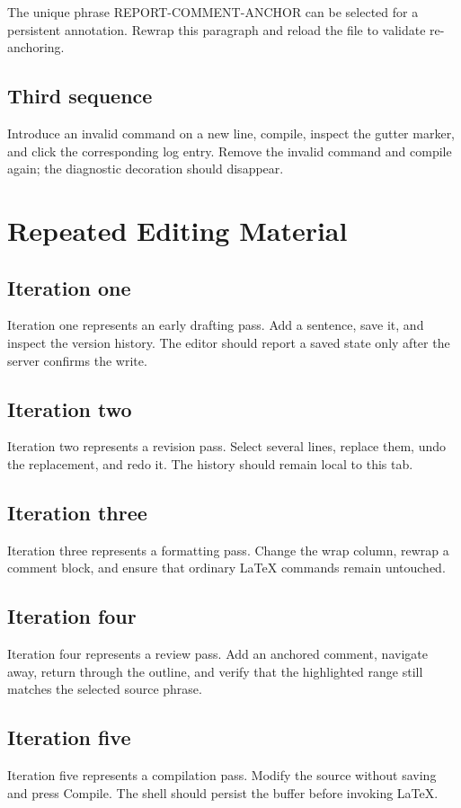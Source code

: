 \documentclass[12pt]{report}
\begin{document}
The unique phrase REPORT-COMMENT-ANCHOR can be selected for a persistent
annotation. Rewrap this paragraph and reload the file to validate re-anchoring.

\section{Third sequence}
Introduce an invalid command on a new line, compile, inspect the gutter marker,
and click the corresponding log entry. Remove the invalid command and compile
again; the diagnostic decoration should disappear.

\chapter{Repeated Editing Material}
\section{Iteration one}
Iteration one represents an early drafting pass. Add a sentence, save it, and
inspect the version history. The editor should report a saved state only after
the server confirms the write.

\section{Iteration two}
Iteration two represents a revision pass. Select several lines, replace them,
undo the replacement, and redo it. The history should remain local to this tab.

\section{Iteration three}
Iteration three represents a formatting pass. Change the wrap column, rewrap a
comment block, and ensure that ordinary LaTeX commands remain untouched.

\section{Iteration four}
Iteration four represents a review pass. Add an anchored comment, navigate away,
return through the outline, and verify that the highlighted range still matches
the selected source phrase.

\section{Iteration five}
Iteration five represents a compilation pass. Modify the source without saving
and press Compile. The shell should persist the buffer before invoking LaTeX.
\end{document}
